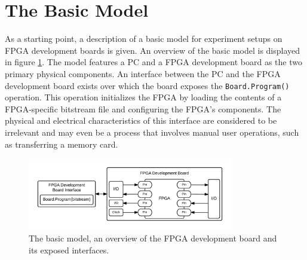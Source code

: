 \documentclass[openright]{uva-bachelor-thesis}
\begin{document}



\section{The Basic Model}
\label{sectionbasicmodel}

As a starting point, a description of a basic model for experiment setups on FPGA development boards is given. An overview of the basic model is displayed in figure \ref{fig:overview-basic}. The model features a PC and a FPGA development board as the two primary physical components. An interface between the PC and the FPGA development board exists over which the board exposes the \texttt{Board.Program()} operation. This operation initializes the FPGA by loading the contents of a FPGA-specific bitstream file and configuring the FPGA's components. The physical and electrical characteristics of this interface are considered to be irrelevant and may even be a process that involves manual user operations, such as transferring a memory card.

\begin{figure}[h]
\centering
\includegraphics[width=0.8\textwidth]{overview-basic}
\caption{The basic model, an overview of the FPGA development board and its exposed interfaces.}
\label{fig:overview-basic}
\end{figure}
\end{document}
